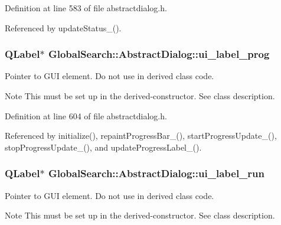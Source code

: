 Definition at line 583 of file abstractdialog.\+h.



Referenced by update\+Status\+\_\+().

\hypertarget{classGlobalSearch_1_1AbstractDialog_a21e1395aea6ac29a9c97b7ec2f54eb14}{}
\subsubsection[{ui\+\_\+label\+\_\+prog}]{\setlength{\rightskip}{0pt plus 5cm}Q\+Label$\ast$ Global\+Search\+::\+Abstract\+Dialog\+::ui\+\_\+label\+\_\+prog\hspace{0.3cm}{\ttfamily [protected]}}\label{classGlobalSearch_1_1AbstractDialog_a21e1395aea6ac29a9c97b7ec2f54eb14}
Pointer to G\+U\+I element. Do not use in derived class code. \begin{DoxyNote}{Note}
This must be set up in the derived-\/constructor. See class description. 
\end{DoxyNote}


Definition at line 604 of file abstractdialog.\+h.



Referenced by initialize(), repaint\+Progress\+Bar\+\_\+(), start\+Progress\+Update\+\_\+(), stop\+Progress\+Update\+\_\+(), and update\+Progress\+Label\+\_\+().

\hypertarget{classGlobalSearch_1_1AbstractDialog_af65c818f2bf846bcd76aa0e755e13453}{}
\subsubsection[{ui\+\_\+label\+\_\+run}]{\setlength{\rightskip}{0pt plus 5cm}Q\+Label$\ast$ Global\+Search\+::\+Abstract\+Dialog\+::ui\+\_\+label\+\_\+run\hspace{0.3cm}{\ttfamily [protected]}}\label{classGlobalSearch_1_1AbstractDialog_af65c818f2bf846bcd76aa0e755e13453}
Pointer to G\+U\+I element. Do not use in derived class code. \begin{DoxyNote}{Note}
This must be set up in the derived-\/constructor. See class description. 
\end{DoxyNote}


